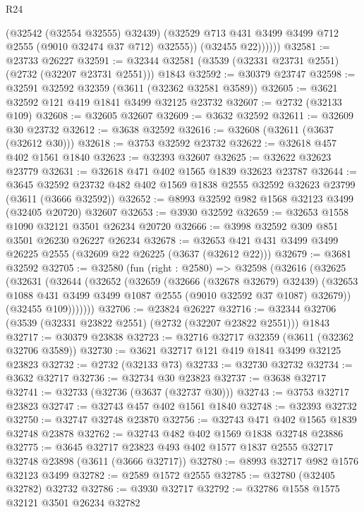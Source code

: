 \begin{lexlean}{R24}
\begin{coremodule}
                (@32542 (@32554 @32555) @32439)
                (@32529 @713 @431 @3499 @3499 @712 @2555 (@9010 @32474 @37 @712) @32555))
              (@32455 @22))))))
@32581 := @23733 @26227
@32591 := @32344 @32581 (@3539 (@32331 @23731 @2551) (@2732 (@32207 @23731 @2551))) @1843
@32592 := @30379 @23747
@32598 := @32591 @32592 @32359 (@3611 (@32362 @32581 @3589))
@32605 := @3621 @32592 @121 @419 @1841 @3499 @32125 @23732
@32607 := @2732 (@32133 @109)
@32608 := @32605 @32607
@32609 := @3632 @32592
@32611 := @32609 @30 @23732
@32612 := @3638 @32592
@32616 := @32608 (@32611 (@3637 (@32612 @30)))
@32618 := @3753 @32592 @23732
@32622 := @32618 @457 @402 @1561 @1840
@32623 := @32393 @32607
@32625 := @32622 @32623 @23779
@32631 := @32618 @471 @402 @1565 @1839 @32623 @23787
@32644 := @3645
    @32592
    @23732
    @482
    @402
    @1569
    @1838
    @2555
    @32592
    @32623
    @23799
    (@3611 (@3666 @32592))
@32652 := @8993 @32592 @982 @1568 @32123 @3499 (@32405 @20720) @32607
@32653 := @3930 @32592
@32659 := @32653 @1558 @1090 @32121 @3501 @26234 @20720
@32666 := @3998 @32592 @309 @851 @3501 @26230 @26227 @26234
@32678 := @32653 @421 @431 @3499 @3499 @26225 @2555 (@32609 @22 @26225 (@3637 (@32612 @22)))
@32679 := @3681 @32592
@32705 := @32580
    (fun (right : @2580) =>
    @32598
      (@32616
        (@32625
          (@32631
            (@32644
              (@32652
                (@32659
                  (@32666 (@32678 @32679) @32439)
                  (@32653 @1088 @431 @3499 @3499 @1087 @2555 (@9010 @32592 @37 @1087) @32679))
                (@32455 @109)))))))
@32706 := @23824 @26227
@32716 := @32344 @32706 (@3539 (@32331 @23822 @2551) (@2732 (@32207 @23822 @2551))) @1843
@32717 := @30379 @23838
@32723 := @32716 @32717 @32359 (@3611 (@32362 @32706 @3589))
@32730 := @3621 @32717 @121 @419 @1841 @3499 @32125 @23823
@32732 := @2732 (@32133 @73)
@32733 := @32730 @32732
@32734 := @3632 @32717
@32736 := @32734 @30 @23823
@32737 := @3638 @32717
@32741 := @32733 (@32736 (@3637 (@32737 @30)))
@32743 := @3753 @32717 @23823
@32747 := @32743 @457 @402 @1561 @1840
@32748 := @32393 @32732
@32750 := @32747 @32748 @23870
@32756 := @32743 @471 @402 @1565 @1839 @32748 @23878
@32762 := @32743 @482 @402 @1569 @1838 @32748 @23886
@32775 := @3645
    @32717
    @23823
    @493
    @402
    @1577
    @1837
    @2555
    @32717
    @32748
    @23898
    (@3611 (@3666 @32717))
@32780 := @8993 @32717 @982 @1576 @32123 @3499
@32782 := @2589 @1572 @2555
@32785 := @32780 (@32405 @32782) @32732
@32786 := @3930 @32717
@32792 := @32786 @1558 @1575 @32121 @3501 @26234 @32782

\end{coremodule}
\end{lexlean}
